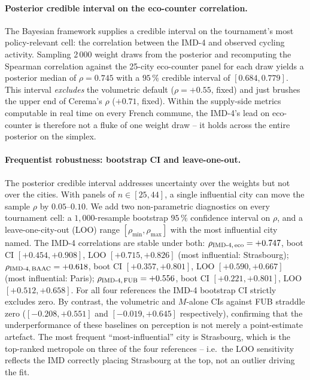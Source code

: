 \documentclass[11pt,a4paper]{article}
\begin{document}
\paragraph{Posterior credible interval on the eco-counter
correlation.}
The Bayesian framework supplies a credible interval on the
tournament's most policy-relevant cell: the correlation between
the IMD-4 and observed cycling activity. Sampling 2\,000 weight
draws from the posterior and recomputing the Spearman
correlation against the 25-city eco-counter panel for each
draw yields a posterior median of $\rho = 0.745$ with a $95\,\%$
credible interval of $[0.684, 0.779]$. This interval
\emph{excludes} the volumetric default ($\rho = +0.55$, fixed)
and just brushes the upper end of Cerema's $\rho$
($+0.71$, fixed). Within the supply-side metrics computable in
real time on every French commune, the IMD-4's lead on
eco-counter is therefore not a fluke of one weight draw -- it
holds across the entire posterior on the simplex.

\paragraph{Frequentist robustness: bootstrap CI and
leave-one-out.}
The posterior credible interval addresses uncertainty over
the weights but not over the cities. With panels of
$n \in [25, 44]$, a single influential city can move the
sample $\rho$ by $0.05$--$0.10$. We add two non-parametric
diagnostics on every tournament cell: a $1{,}000$-resample
bootstrap $95\,\%$ confidence interval on $\rho$, and a
leave-one-city-out (LOO) range
$[\rho_{\min}, \rho_{\max}]$ with the most influential city
named. The IMD-4 correlations are stable under both:
$\rho_{\text{IMD-4,\,eco}} = +0.747$,
boot CI $[+0.454, +0.908]$, LOO $[+0.715, +0.826]$ (most
influential: Strasbourg);
$\rho_{\text{IMD-4,\,BAAC}} = +0.618$,
boot CI $[+0.357, +0.801]$, LOO $[+0.590, +0.667]$
(most influential: Paris);
$\rho_{\text{IMD-4,\,FUB}} = +0.556$,
boot CI $[+0.221, +0.801]$, LOO $[+0.512, +0.658]$.
For all four references the IMD-4 bootstrap CI strictly
excludes zero. By contrast, the volumetric and
$M$-alone CIs against FUB straddle zero
($[-0.208, +0.551]$ and $[-0.019, +0.645]$ respectively),
confirming that the underperformance of these baselines on
perception is not merely a point-estimate artefact. The most
frequent ``most-influential'' city is Strasbourg, which is
the top-ranked metropole on three of the four references --
i.e.\ the LOO sensitivity reflects the IMD correctly placing
Strasbourg at the top, not an outlier driving the fit.
\end{document}
